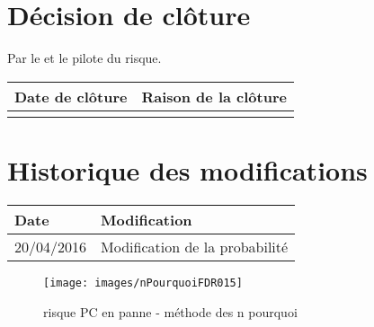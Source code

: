 \section*{Décision de clôture}
Par le \CP{} et le pilote du risque.
\begin{table}[H]
\centering
	\begin{tabularx}{16.8cm}{|X|X|}
	\hline
	\rowcolor{gray!40} Date de clôture & Raison de la clôture \\
	\hline
	  & \\
	\hline
	\end{tabularx}
\end{table}

\section*{Historique des modifications}
\begin{table}[H]
\centering
	\begin{tabularx}{16.8cm}{|X|X|}
	\hline
	\rowcolor{gray!40} Date & Modification \\
	\hline
	 20/04/2016 & Modification de la probabilité \\
	\hline
	\end{tabularx}
\end{table}
\newpage


\begin{figure}
	\centering
	\texttt{[image: images/nPourquoiFDR015]}
	\caption{\label{PC en panne}risque PC en panne - méthode des n pourquoi}
\end{figure}